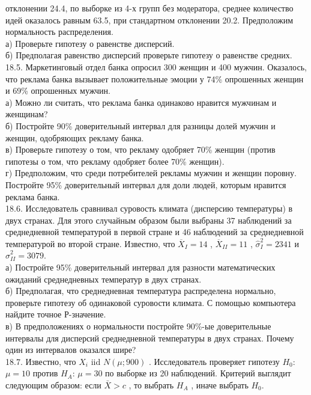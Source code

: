 \documentclass[pdftex,12pt,a4paper]{article}
\begin{document}
отклонении 24.4, по выборке из 4-х групп без модератора, среднее
количество идей оказалось равным 63.5, при стандартном отклонении
20.2. Предположим нормальность распределения. \\
а) Проверьте гипотезу о равенстве дисперсий. \\
б) Предполагая равенство дисперсий проверьте гипотезу о равенстве средних. \\
18.5. Маркетинговый отдел банка опросил 300 женщин и 400 мужчин.
Оказалось, что реклама банка вызывает положительные эмоции у 74\%
опрошенных женщин и 69\% опрошенных мужчин. \\
а)  Можно ли считать, что реклама банка одинаково нравится
мужчинам и женщинам? \\
б) Постройте 90\% доверительный интервал для разницы долей мужчин
и женщин, одобряющих рекламу банка. \\
в) Проверьте гипотезу о том, что рекламу одобряет 70\% женщин
(против гипотезы о том, что рекламу одобряет более 70\% женщин).
\\
г) Предположим, что среди потребителей рекламы мужчин и женщин
поровну. Постройте 95\% доверительный интервал для доли людей,
которым нравится реклама
банка. \\
18.6. Исследователь сравнивал суровость климата (дисперсию
температуры) в двух странах. Для этого случайным образом были
выбраны 37 наблюдений за среднедневной температурой в первой
стране и 46 наблюдений за среднедневной температурой во второй
стране. Известно, что  $\overline{X}_{I} =14$ ,
$\overline{X}_{II} =11$ , $\hat{\sigma }_{I}^{2} =2341$  и
$\hat{\sigma }_{II}^{2} =3079$.
\\ а)  Постройте 95\% доверительный интервал для разности
математических ожиданий среднедневных температур в двух странах.\\
б)  Предполагая, что среднедневная температура распределена
нормально, проверьте гипотезу об одинаковой суровости климата. С
помощью компьютера найдите точное Р-значение. \\
в)  В
предположениях о нормальности постройте 90\%-ые доверительные
интервалы для дисперсий среднедневной температуры в двух странах.
Почему один из
интервалов оказался шире? \\
18.7. Известно, что  $X_{i}$ iid $N\left(\mu ;900\right)$ .
Исследователь проверяет гипотезу $H_{0}$: $\mu =10$  против
$H_{A}$: $\mu =30$  по выборке из 20 наблюдений. Критерий выглядит
следующим образом: если  $\bar{X}>c$ , то выбрать  $H_{A} $ ,
иначе выбрать  $H_{0} $.\\
\end{document}
